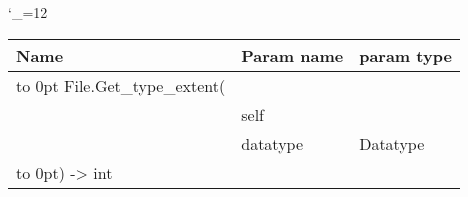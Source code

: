 \begingroup \catcode`\_=12 \tt
\begin{tabular}{lll}
\toprule
\textrm{Name}&\textrm{Param name}&\textrm{param type}\\
\midrule
\hbox to 0pt {File.Get_type_extent(\hss}\\
& self\\
& datatype & Datatype\\
\hbox to 0pt{) -> int\hss}\\
\bottomrule
\end{tabular}
\endgroup
